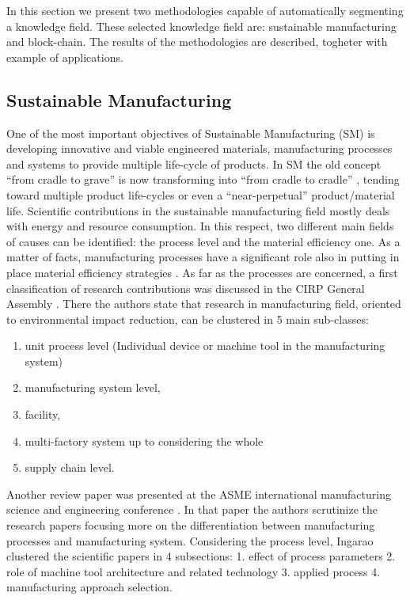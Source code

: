 \documentclass[]{book}
\providecommand{\tightlist}{%
  \setlength{\itemsep}{0pt}\setlength{\parskip}{0pt}}
\begin{document}
In this section we present two methodologies capable of automatically
segmenting a knowledge field. These selected knowledge field are:
sustainable manufacturing and block-chain. The results of the
methodologies are described, togheter with example of applications.

\subsection{Sustainable Manufacturing}\label{sustainable-manufacturing}

One of the most important objectives of Sustainable Manufacturing (SM)
is developing innovative and viable engineered materials, manufacturing
processes and systems to provide multiple life-cycle of products. In SM
the old concept ``from cradle to grave'' is now transforming into ``from
cradle to cradle'' \citep{jawahir2016technological}, tending toward
multiple product life-cycles or even a ``near-perpetual''
product/material life. Scientific contributions in the sustainable
manufacturing field mostly deals with energy and resource consumption.
In this respect, two different main fields of causes can be identified:
the process level and the material efficiency one. As a matter of facts,
manufacturing processes have a significant role also in putting in place
material efficiency strategies \citep{ingarao2017manufacturing}. As far
as the processes are concerned, a first classification of research
contributions was discussed in the CIRP General Assembly
\citep{duflou2012towards}. There the authors state that research in
manufacturing field, oriented to environmental impact reduction, can be
clustered in 5 main sub-classes:

\begin{enumerate}
\def\labelenumi{\arabic{enumi}.}
\tightlist
\item
  unit process level (Individual device or machine tool in the
  manufacturing system)
\item
  manufacturing system level,
\item
  facility,
\item
  multi-factory system up to considering the whole
\item
  supply chain level.
\end{enumerate}

Another review paper was presented at the ASME international
manufacturing science and engineering conference
\citep{haapala2013review}. In that paper the authors scrutinize the
research papers focusing more on the differentiation between
manufacturing processes and manufacturing system. Considering the
process level, Ingarao \citep{ingarao2017manufacturing} clustered the
scientific papers in 4 subsections: 1. effect of process parameters 2.
role of machine tool architecture and related technology 3. applied
process 4. manufacturing approach selection.
\end{document}
